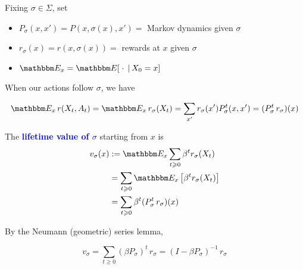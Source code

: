\documentclass[xcolor=dvipsnames]{beamer}
\renewcommand{\geq}{\geqslant}
\newcommand{\navy}[1]{\textcolor{Blue}{\bf #1}}
\newcommand{\EE}{\mathbbm E}
\renewcommand{\geq}{\geqslant}
\newcommand{\given}{\, | \,}
\newcommand{\1}{\mathbbm 1}
\begin{document}
\begin{frame}

    Fixing $\sigma \in \Sigma$, set
    \begin{itemize}
        \item $P_\sigma(x, x') = P(x, \sigma(x), x') =$ Markov dynamics given
            $\sigma$
        \vspace{0.5em}
        \item $r_\sigma(x) = r(x, \sigma(x)) = $ rewards at $x$ given $\sigma$
        \vspace{0.5em}
        \item $\EE_x = \EE[ \; \cdot \; \given X_0 = x]$
    \end{itemize}

    \vspace{0.5em}
    \vspace{0.5em}
    \vspace{0.5em}
    \vspace{0.5em}
    When our actions follow $\sigma$, we have
    
    \begin{equation*}
        \EE_x  \, r(X_t, A_t) 
         = \EE_x  \, r_\sigma(X_t)  
         = \sum_{x'} r_\sigma(x') P_\sigma^t (x, x')
        = (P_\sigma^t \, r_\sigma) (x)
    \end{equation*}

\end{frame}



\begin{frame}

    
    \vspace{0.5em}
    \vspace{0.5em}
    The \navy{lifetime value of $\sigma$} starting from $x$ is
    \begin{align*}
        v_\sigma (x) 
        & := \EE_x 
            \sum_{t \geq 0} \beta^t r_\sigma(X_t) 
            \\
        & = \sum_{t \geq 0} \EE_x \left[ \beta^t r_\sigma(X_t) \right]
            \\
        & = \sum_{t \geq 0} \beta^t (P_\sigma^t \, r_\sigma)(x)
    \end{align*}


    \vspace{0.5em}
    By the Neumann (geometric) series lemma,

    \begin{equation*}
        v_\sigma 
        = \sum_{t \geq 0} (\beta P_\sigma)^t \, r_\sigma
        = (I - \beta P_\sigma)^{-1} \, r_\sigma 
    \end{equation*}


\end{frame}
\end{document}
